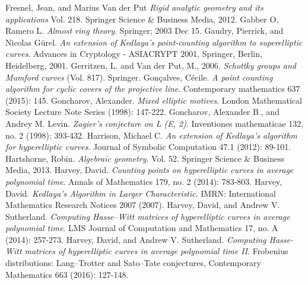 \documentclass[10pt,]{book}
\numberwithin{equation}{section}
\begin{document}
\begin{thebibliography}{9}
\hypertarget{bib-fresnel-van-der-put}{}Fresnel, Jean, and Marius Van der Put \textit{Rigid analytic geometry and its applications} Vol. 218. Springer Science \& Business Media, 2012.
\hypertarget{bib-gabber-ramero}{}Gabber O, Ramero L. \textit{Almost ring theory}. Springer; 2003 Dec 15.
\hypertarget{bib-gaudry-gurel}{}Gaudry, Pierrick, and Nicolas Gürel. \textit{An extension of Kedlaya's point-counting algorithm to superelliptic curves}. Advances in Cryptology - ASIACRYPT 2001, Springer, Berlin, Heidelberg, 2001.
\hypertarget{bib-gerritzen-van-der-put}{}Gerritzen, L. and Van der Put, M., 2006. \textit{Schottky groups and Mumford curves} (Vol. 817). Springer.
\hypertarget{bib-goncalves}{}Gonçalves, Cécile. \textit{A point counting algorithm for cyclic covers of the projective line}. Contemporary mathematics 637 (2015): 145.
\hypertarget{bib-goncharov-mixed}{}Goncharov, Alexander. \textit{Mixed elliptic motives}. London Mathematical Society Lecture Note Series (1998): 147-222.
\hypertarget{bib-gl}{}Goncharov, Alexander B., and Andrey M. Levin. \textit{Zagier's conjecture on L (E, 2)}. Inventiones mathematicae 132, no. 2 (1998): 393-432.
\hypertarget{bib-harrison-hyperelliptic}{}Harrison, Michael C. \textit{An extension of Kedlaya's algorithm for hyperelliptic curves}. Journal of Symbolic Computation 47.1 (2012): 89-101.
\hypertarget{bib-hartshorne}{}Hartshorne, Robin. \textit{Algebraic geometry}. Vol. 52. Springer Science \& Business Media, 2013.
\hypertarget{bib-harvey-average}{}Harvey, David. \textit{Counting points on hyperelliptic curves in average polynomial time}. Annals of Mathematics 179, no. 2 (2014): 783-803.
\hypertarget{bib-harvey-sqrtp}{}Harvey, David. \textit{Kedlaya's Algorithm in Larger Characteristic}. IMRN: International Mathematics Research Notices 2007 (2007).
\hypertarget{bib-harvey-sutherland}{}Harvey, David, and Andrew V. Sutherland. \textit{Computing Hasse–Witt matrices of hyperelliptic curves in average polynomial time}. LMS Journal of Computation and Mathematics 17, no. A (2014): 257-273.
\hypertarget{bib-harvey-sutherland-ii}{}Harvey, David, and Andrew V. Sutherland. \textit{Computing Hasse-Witt matrices of hyperelliptic curves in average polynomial time II}. Frobenius distributions: Lang–Trotter and Sato–Tate conjectures, Contemporary Mathematics 663 (2016): 127-148.

\end{thebibliography}
\end{document}
